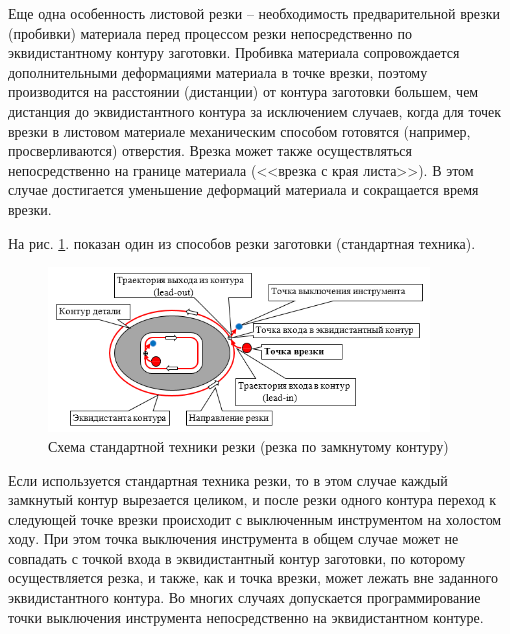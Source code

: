 \documentclass[11pt,twoside,openany]{report}
\begin{document}
Еще одна особенность листовой резки –
необходимость предварительной врезки (пробивки)
материала перед процессом резки непосредственно
по эквидистантному контуру заготовки.
Пробивка материала сопровождается дополнительными
деформациями материала в точке врезки,
поэтому производится на расстоянии (дистанции)
от контура заготовки большем,
чем дистанция до эквидистантного контура за исключением случаев,
когда для точек врезки в листовом материале механическим способом
готовятся (например, просверливаются)
отверстия.
Врезка может также осуществляться
непосредственно на границе материала
(<<врезка с края листа>>).
В этом случае достигается уменьшение
деформаций материала и сокращается время врезки.

На рис. \ref{standard-cutting}.
показан
один из способов резки заготовки
(стандартная техника).

\begin{figure}[h]
  \begin{center}
  \includegraphics[width=0.9\textwidth]{cutting-path.png}
  \caption{Схема стандартной техники резки (резка по замкнутому контуру)}
  \label{standard-cutting}
  \end{center}
\end{figure}

Если используется стандартная техника резки,
то в этом случае каждый замкнутый контур вырезается целиком,
и после резки одного контура переход к следующей точке врезки
происходит с выключенным инструментом на холостом ходу.
При этом точка выключения инструмента
в общем случае
может не совпадать с точкой входа в эквидистантный контур заготовки,
по которому осуществляется резка, и также,
как и точка врезки,
может лежать вне заданного эквидистантного контура.
Во многих случаях допускается программирование точки выключения
инструмента непосредственно на эквидистантном контуре.
\end{document}
